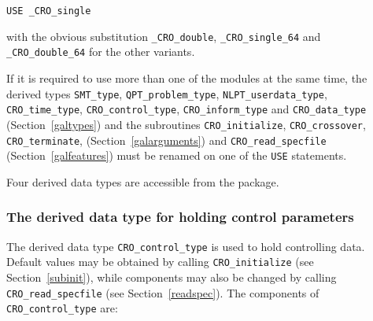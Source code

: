 \documentclass{galahad}
\newcommand{\packagename}{CRO}
\newcommand{\fullpackagename}{\libraryname\_\packagename}
\begin{document}
\hspace{8mm} {\tt USE \fullpackagename\_single}

\medskip
\noindent
with the obvious substitution {\tt \fullpackagename\_double},
{\tt \fullpackagename\_single\_64} and 
{\tt \fullpackagename\_double\_64} for the other variants.

\noindent
If it is required to use more than one of the modules at the same time, 
the derived types
{\tt SMT\_type},
{\tt QPT\_problem\_type},
{\tt NLPT\_user\-data\-\_type},
{\tt \packagename\_time\_type},
{\tt \packagename\_control\_type},
{\tt \packagename\_inform\_type}
and
{\tt \packagename\_data\_type}
(Section~\ref{galtypes})
and the subroutines
{\tt \packagename\_initialize},
{\tt \packagename\_\-crossover},
{\tt \packagename\_terminate},
(Section~\ref{galarguments})
and
{\tt \packagename\_read\_specfile}
(Section~\ref{galfeatures})
must be renamed on one of the {\tt USE} statements.








\galtypes
Four derived data types are accessible from the package.


\subsubsection{The derived data type for holding control
 parameters}\label{typecontrol}
The derived data type
{\tt \packagename\_control\_type}
is used to hold controlling data. Default values may be obtained by calling
{\tt \packagename\_initialize}
(see Section~\ref{subinit}),
while components may also be changed by calling
{\tt \packagename\_read\-\_specfile}
(see Section~\ref{readspec}).
The components of
{\tt \packagename\_control\_type}
are:
\end{document}
